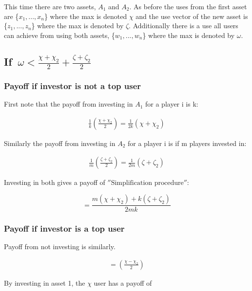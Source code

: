 \documentclass{article}
\begin{document}
This time there are two assets, $A_1$ and $A_2$. As before the uses from the first asset are \{$x_1,...,x_n$\} where the max is denoted $\chi$ and the use vector of the new asset is {\{$z_1,...,z_n$\}} where the max is denoted by $\zeta$. Additionally there is a use all users can achieve from using both assets, {\{$w_1,...,w_n$\}} where the max is denoted by $\omega$.

\subsection{If~$\omega<\frac{\chi+\chi_{2}}{2}+\frac{\zeta+\zeta_{2}}{2}$}

\subsubsection{Payoff if investor is not a top user}
First note that the payoff from investing in $A_1$ for a player i is k:  

\begin{align*}
\frac{1}{k}\left(\frac{\chi+\chi_{2}}{2}\right) = \frac{1}{2k}\left(\chi+\chi_{2}\right)
\end{align*}

Similarly the payoff from investing in $A_2$ for a player i is if m players invested in:  

\begin{align*}
\frac{1}{m}\left(\frac{\zeta+\zeta_{2}}{2}\right)=\frac{1}{2m}\left( \zeta+\zeta_{2}\right)
\end{align*}

Investing in both gives a payoff of $\hyperref[RIB]{''\text{Simplification procedure}''}$: 

\begin{equation*}
=
\frac{m
\left( \chi + \chi_{2} 
\right)
+k
\left( \zeta+\zeta_{2} 
\right)}{2mk}
\end{equation*}

\subsubsection{Payoff if investor is a top user}

Payoff from not investing is similarly. 

\begin{align*}
=\left(\frac{\chi-\chi_{2}}{2}
\right)
\end{align*}

By investing in asset 1, the $\chi$ user has a payoff of
\end{document}
